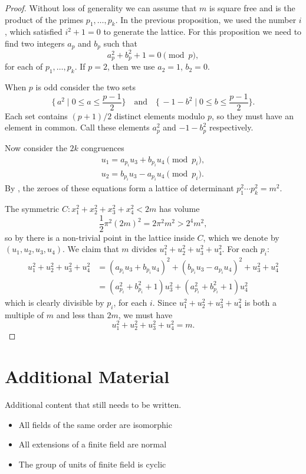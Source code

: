 \begin{proof}
Without loss of generality we can assume that $m$ is square free and
is the product of the primes $p_1, \ldots, p_k$.  In the previous
proposition, we used the number $i$, which satisfied $i^2+1 = 0$ to
generate the lattice.  For this proposition we need to find two
integers $a_p$ and $b_p$ such that
\[
a_p^2 + b_p^2 + 1 = 0 \pmod{p},
\]
for each of $p_1, \ldots, p_k$.  If $p = 2$, then we use $a_2 = 1$,
$b_2 = 0$.

When $p$ is odd consider the two sets
\[
\{\,a^2 \mid 0 \le a \le \frac{p-1}{2}\}
\quad\mbox{and}\quad
\{\,-1 - b^2 \mid 0 \le b \le \frac{p-1}{2}\}.
\]
Each set contains $(p+1)/2$ distinct elements modulo $p$, so they must
have an element in common.  Call these elements $a_p^2$ and $-1
-b_p^2$ respectively.

Now consider the $2k$ congruences
\[
\begin{aligned}
   u_1 = a_{p_i} u_3 + b_{p_i} u_4 \pmod{p_i}, \\
   u_2 = b_{p_i} u_3 - a_{p_i} u_4 \pmod{p_i}.
\end{aligned}
\]
By , the zeroes of these equations form a
lattice of determinant $p_1^2 \cdots p_k^2 = m^2$.

The symmetric  $C: x_1^2 + x_2^2 + x_3^2 + x_4^2 < 2m$ has
volume 
\[
\frac{1}{2} \pi^2 (2m)^2 = 2\pi^2 m^2 > 2^4 m^2,
\]
so by  there is a non-trivial point in
the lattice inside $C$, which we denote by $(u_1, u_2, u_3, u_4)$.  We
claim that $m$ divides $u_1^2 + u_2^2 + u_3^2 + u_4^2$.  For each $p_i$:
\[
\begin {aligned}
  u_1^2 + u_2^2 + u_3^2 + u_4^2
    & = (a_{p_i} u_3 + b_{p_i} u_4)^2 + (b_{p_i} u_3 - a_{p_i} u_4)^2
+ u_3^2 + u_4^2 \\
    & = (a_{p_i}^2 + b_{p_i}^2 + 1) u_3^2 + 
        (a_{p_i}^2 + b_{p_i}^2 + 1) u_4^2
\end{aligned}
\]
which is clearly divisible by $p_i$, for each $i$.  Since
$u_1^2+u_2^2+u_3^2+u_4^2$ is both a multiple of $m$ and less than
$2m$, we must have
\[
u_1^2+u_2^2+u_3^2+u_4^2 = m.
\]
\end{proof}

\section{Additional Material}
Additional content that still needs to be written.

\begin{itemize}
\item All fields of the same order are isomorphic
\item All extensions of a finite field are normal
\item The group of units of finite field is cyclic
\end{itemize}



